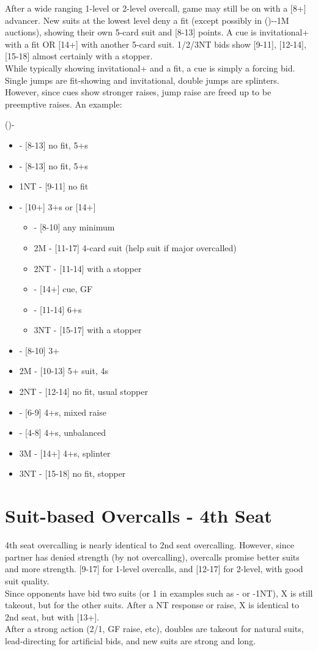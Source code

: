 \documentclass[12pt]{report}
\newcommand{\n}{\\}
\newcommand{\q}[1]{\multido{}{#1}{\qquad}}
\newcommand{\ul}[1]{\begin{itemize}#1\end{itemize}}
\newcommand{\li}[1]{\item[~] \q{#1}}
\begin{document}
    After a wide ranging 1-level or 2-level overcall, game may still be on with a [8+] advancer.  New suits at the lowest level deny a fit (except possibly in ()--1M auctions), showing their own 5-card suit and [8-13] points.  A cue is invitational+ with a fit OR [14+] with another 5-card suit.  1/2/3NT bids show [9-11], [12-14], [15-18] almost certainly with a stopper. \n

    While typically showing invitational+ and a fit, a cue is simply a forcing bid.  Single jumps are fit-showing and invitational, double jumps are splinters.  However, since cues show stronger raises, jump raise are freed up to be preemptive raises.  An example:

    ()-
    \ul{
        \li0  - [8-13] no fit, 5+\he{}s
        \li0 \sp1 - [8-13] no fit, 5+\sp{}s
        \li0 1NT - [9-11] no fit
        \li0 \cl2 - [10+] 3+\di{}s or [14+] \ul{
            \li0 \di2 - [8-10] any minimum
            \li0 2M - [11-17] 4-card suit (help suit if major overcalled)
            \li0 2NT - [11-14] with a stopper
            \li0 \cl3 - [14+] cue, GF
            \li0 \di3 - [11-14] 6+\di{}s
            \li0 3NT - [15-17] with a stopper
        }
        
        \li0 \di2 - [8-10] 3+\di{}
        \li0 2M - [10-13] 5+ suit, 4\di{}s
        \li0 2NT - [12-14] no fit, usual stopper
        \li0 \cl3 - [6-9] 4+\di{}s, mixed raise
        \li0 \di3 - [4-8] 4+\di{}s, unbalanced
        \li0 3M - [14+] 4+\di{}s, splinter
        \li0 3NT - [15-18] no fit, stopper
    }

\section{Suit-based Overcalls - 4th Seat} \label{4:3}

    4th seat overcalling is nearly identical to 2nd seat overcalling.  However, since partner has denied strength (by not overcalling), overcalls promise better suits and more strength.  [9-17] for 1-level overcalls, and [12-17] for 2-level, with good suit quality. \n

    Since opponents have bid two suits (or 1 in examples such as - or -1NT), X is still takeout, but for the other suits.  After a NT response or raise, X is identical to 2nd seat, but with [13+]. \n

    After a strong action (2/1, GF raise, etc), doubles are takeout for natural suits, lead-directing for artificial bids, and new suits are strong and long. \n
    
\end{document}
